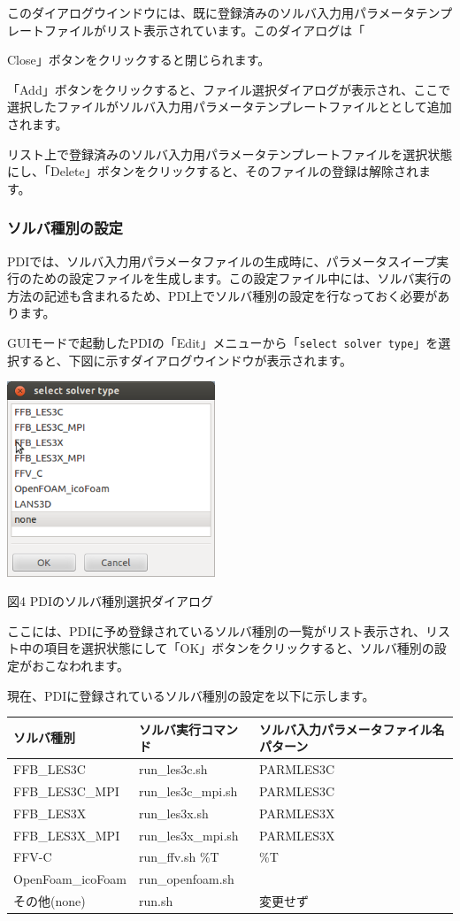 \documentclass[a4paper,11pt]{jarticle}
\begin{document}
このダイアログウインドウには、既に登録済みのソルバ入力用パラメータテンプレートファイルがリスト表示されています。このダイアログは「{Close」ボタンをクリックすると閉じられます。

「Add」ボタンをクリックすると、ファイル選択ダイアログが表示され、ここで選択したファイルがソルバ入力用パラメータテンプレートファイルととして追加されます。

リスト上で登録済みのソルバ入力用パラメータテンプレートファイルを選択状態にし、「Delete」ボタンをクリックすると、そのファイルの登録は解除されます。


\subsubsection{ソルバ種別の設定}

PDIでは、ソルバ入力用パラメータファイルの生成時に、パラメータスイープ実行のための設定ファイルを生成します。この設定ファイル中には、ソルバ実行の方法の記述も含まれるため、PDI上でソルバ種別の設定を行なっておく必要があります。

GUIモードで起動したPDIの「Edit」メニューから「{\tt select solver type}」を選択すると、下図に示すダイアログウインドウが表示されます。

\begin{center}
\includegraphics[width=176pt, bb=0 0 312 296]{figs/fig004.png}

図4 PDIのソルバ種別選択ダイアログ
\end{center}

ここには、PDIに予め登録されているソルバ種別の一覧がリスト表示され、リスト中の項目を選択状態にして「OK」ボタンをクリックすると、ソルバ種別の設定がおこなわれます。

現在、PDIに登録されているソルバ種別の設定を以下に示します。

\begin{tt}
\begin{tabular}{|l|l|l|}
\hline
ソルバ種別 & ソルバ実行コマンド & ソルバ入力パラメータファイル名パターン\tabularnewline
\hline
FFB\_LES3C & run\_les3c.sh & PARMLES3C\tabularnewline
\hline
FFB\_LES3C\_MPI & run\_les3c\_mpi.sh & PARMLES3C\tabularnewline
\hline
FFB\_LES3X & run\_les3x.sh & PARMLES3X\tabularnewline
\hline
FFB\_LES3X\_MPI & run\_les3x\_mpi.sh & PARMLES3X\tabularnewline
\hline
FFV-C & run\_ffv.sh \%T & \%T \tabularnewline
\hline
OpenFoam\_icoFoam & run\_openfoam.sh &  \tabularnewline
\hline
その他(none) & run.sh & 変更せず\tabularnewline
\hline
\end{tabular}
\end{tt}

}
\end{document}
